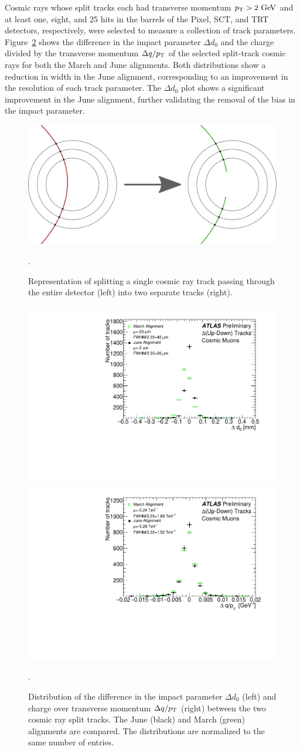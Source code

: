 Cosmic rays whose split tracks each had transverse momentum $\pt > 2\gev$ and at least one, eight, and 25 hits in the barrels of the Pixel, SCT, and TRT detectors, respectively, were selected to measure a collection of track parameters.
Figure~\ref{fig:align_2015_results_cosmic} shows the difference in the impact parameter $\Delta d_0$ and the charge divided by the transverse momentum $\Delta q/p_{\mathrm{T}}$ of the selected split-track cosmic rays for both the March and June alignments.
Both distributions show a reduction in width in the June alignment, corresponding to an improvement in the resolution of each track parameter. 
The $\Delta d_0$ plot shows a significant improvement in the June alignment, further validating the removal of the bias in the impact parameter.

\begin{figure}[htbp]
  \centering
  \includegraphics[width=.6\textwidth]{figs/alignment/split-track}
  \caption{Representation of splitting a single cosmic ray track passing through the entire detector (left) into two separate tracks (right).}
  \label{fig:align_2015_results_split_track}.
\end{figure}

\begin{figure}[htbp]
  \centering
  \includegraphics[width=.48\textwidth]{figs/alignment/align2015/DELTAD0}
  \includegraphics[width=.48\textwidth]{figs/alignment/align2015/DELTAQOPT}
  \caption{Distribution of the difference in the impact parameter $\Delta d_0$ (left) and charge over transverse momentum $\Delta q/p_{\mathrm{T}}$ (right) between the two cosmic ray split tracks.  The June (black) and March (green) alignments are compared.  The distributions are normalized to the same number of entries.}
  \label{fig:align_2015_results_cosmic}.
\end{figure}

